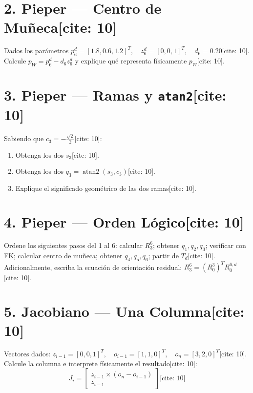 \documentclass[11pt, a4paper]{article}
\begin{document}
\section*{2. Pieper — Centro de Muñeca[cite: 10]}
Dados los parámetros $p_6^d=[1.8, 0.6, 1.2]^T, \quad z_6^d=[0, 0, 1]^T, \quad d_6=0.20$[cite: 10].\\
Calcule $p_W = p_6^d - d_6 z_6^d$ y explique qué representa físicamente $p_W$[cite: 10].
\vspace{2cm}

\section*{3. Pieper — Ramas y \texttt{atan2}[cite: 10]}
Sabiendo que $c_3 = -\frac{\sqrt{2}}{2}$[cite: 10]:
\begin{enumerate}
    \item[a)] Obtenga los dos $s_3$[cite: 10].
    \item[b)] Obtenga los dos $q_3 = \operatorname{atan2}(s_3, c_3)$[cite: 10].
    \item[c)] Explique el significado geométrico de las dos ramas[cite: 10].
\end{enumerate}
\vspace{2.5cm}

\section*{4. Pieper — Orden Lógico[cite: 10]}
Ordene los siguientes pasos del 1 al 6: calcular $R_3^6$; obtener $q_1, q_2, q_3$; verificar con FK; calcular centro de muñeca; obtener $q_4, q_5, q_6$; partir de $T_d$[cite: 10]. \\
Adicionalmente, escriba la ecuación de orientación residual: $R_3^6 = (R_0^3)^T R_0^{6,d}$[cite: 10].
\vspace{1.5cm}

\section*{5. Jacobiano — Una Columna[cite: 10]}
Vectores dados: $z_{i-1}=[0,0,1]^T, \quad o_{i-1}=[1,1,0]^T, \quad o_n=[3,2,0]^T$[cite: 10].
Calcule la columna e interprete físicamente el resultado[cite: 10]:
\begin{equation*}
    J_i = \begin{bmatrix} z_{i-1} \times (o_n - o_{i-1}) \\ z_{i-1} \end{bmatrix} \text{[cite: 10]}
\end{equation*}
\vspace{2cm}
\end{document}
